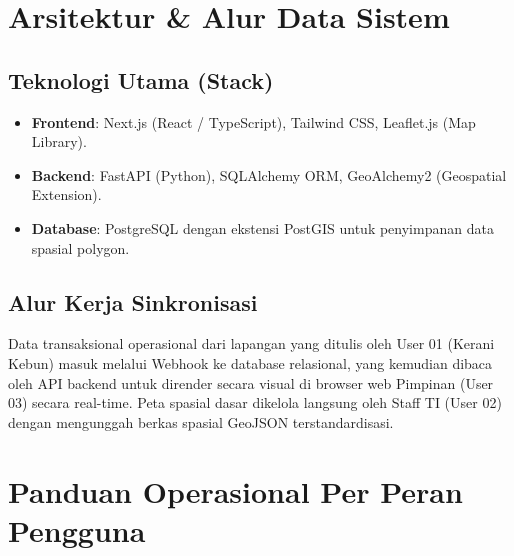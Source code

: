 \documentclass[12pt, a4paper]{article}
\begin{document}
\newpage

\section{Arsitektur \& Alur Data Sistem}

\subsection{Teknologi Utama (Stack)}
\begin{itemize}
    \item \textbf{Frontend}: Next.js (React / TypeScript), Tailwind CSS, Leaflet.js (Map Library).
    \item \textbf{Backend}: FastAPI (Python), SQLAlchemy ORM, GeoAlchemy2 (Geospatial Extension).
    \item \textbf{Database}: PostgreSQL dengan ekstensi PostGIS untuk penyimpanan data spasial polygon.
\end{itemize}

\subsection{Alur Kerja Sinkronisasi}
Data transaksional operasional dari lapangan yang ditulis oleh User 01 (Kerani Kebun) masuk melalui Webhook ke database relasional, yang kemudian dibaca oleh API backend untuk dirender secara visual di browser web Pimpinan (User 03) secara real-time. Peta spasial dasar dikelola langsung oleh Staff TI (User 02) dengan mengunggah berkas spasial GeoJSON terstandardisasi.

\newpage

\section{Panduan Operasional Per Peran Pengguna}
\end{document}
